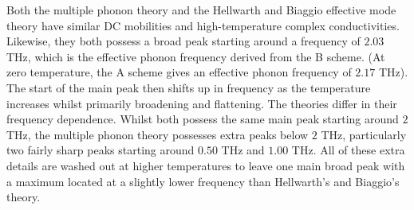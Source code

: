 Both the multiple phonon theory and the Hellwarth and Biaggio effective mode theory have similar DC mobilities and high-temperature complex conductivities. Likewise, they both possess a broad peak starting around a frequency of $2.03$ THz, which is the effective phonon frequency derived from the B scheme. (At zero temperature, the A scheme gives an effective phonon frequency of $2.17$ THz). The start of the main peak then shifts up in frequency as the temperature increases whilst primarily broadening and flattening. The theories differ in their frequency dependence. Whilst both possess the same main peak starting around $2$ THz, the multiple phonon theory possesses extra peaks below $2$ THz, particularly two fairly sharp peaks starting around $0.50$ THz and $1.00$ THz. All of these extra details are washed out at higher temperatures to leave one main broad peak with a maximum located at a slightly lower frequency than Hellwarth's and Biaggio's theory.

